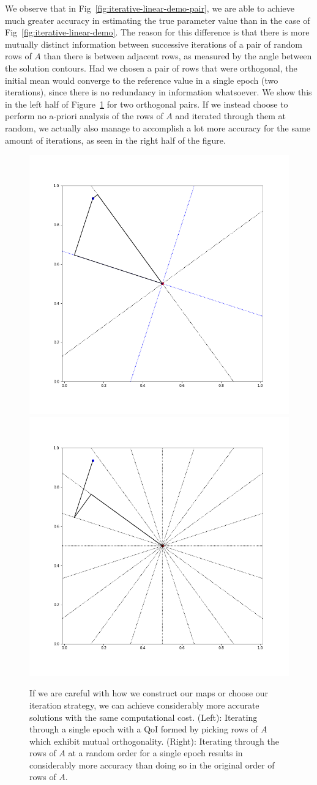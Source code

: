 We observe that in Fig~\ref{fig:iterative-linear-demo-pair}, we are able to achieve much greater accuracy in estimating the true parameter value than in the case of Fig~\ref{fig:iterative-linear-demo}.
The reason for this difference is that there is more mutually distinct information between successive iterations of a pair of random rows of $A$ than there is between adjacent rows, as measured by the angle between the solution contours.
Had we chosen a pair of rows that were orthogonal, the initial mean would converge to the reference value in a single epoch (two iterations), since there is no redundancy in information whatsoever.
We show this in the left half of Figure~\ref{fig:iterative-linear-demo-smart} for two orthogonal pairs.
If we instead choose to perform no a-priori analysis of the rows of $A$ and iterated through them at random, we actually also manage to accomplish a lot more accuracy for the same amount of iterations, as seen in the right half of the figure.

\begin{figure}
  \centering
  \includegraphics[width=0.475\linewidth]{examples/iterative/10D-firstepoch-pair-smart}
  \includegraphics[width=0.475\linewidth]{examples/iterative/10D-firstepoch-rand}
  \caption{
  If we are careful with how we construct our maps or choose our iteration strategy, we can achieve considerably more accurate solutions with the same computational cost.
  (Left): Iterating through a single epoch with a QoI formed by picking rows of $A$ which exhibit mutual orthogonality.
  (Right): Iterating through the rows of $A$ at a random order for a single epoch results in considerably more accuracy than doing so in the original order of rows of $A$.
  }
  \label{fig:iterative-linear-demo-smart}
\end{figure}

